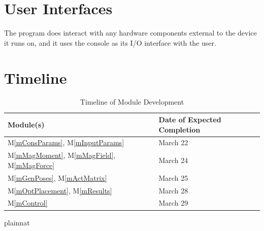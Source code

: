 \documentclass[12pt, titlepage]{article}
\newcommand{\mref}[1]{M\ref{#1}}
\begin{document}
\section{User Interfaces}
The program does interact with any hardware components external to the device it runs on, and it uses the console as its I/O interface with the user. 

\section{Timeline}
\begin{table}[H]
\centering
\begin{tabular}{ m{5em} | m{4cm} } 
  \textbf{Module(s)}& \textbf{Date of Expected Completion} \\ 
  \hline
  \mref{mConsParams}, \mref{mInputParams} & March 22 \\ 
  \hline
  \mref{mMagMoment}, \mref{mMagField}, \mref{mMagForce} & March 24 \\ 
  \hline
  \mref{mGenPoses}, \mref{mActMatrix} & March 25 \\ 
  \hline
  \mref{mOptPlacement}, \mref{mResults} & March 28 \\ 
  \hline
  \mref{mControl} & March 29 \\ 
\end{tabular} 
\caption{Timeline of Module Development}
\label{Timeline}
\end{table}


 {plainnat}


\newpage{}
\end{document}
